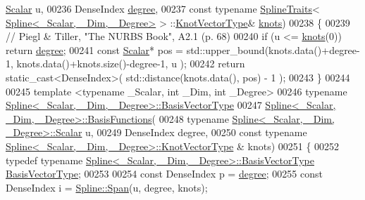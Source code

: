 \begin{DoxyCode}
      \hyperlink{group___splines___module_a8cafd78b564825c76fbb3419653d9742}{Scalar} u,
00236     DenseIndex \hyperlink{group___splines___module_a0df23e941ac0f31dcd095a4dd4f4a7ec}{degree},
00237     \textcolor{keyword}{const} \textcolor{keyword}{typename} \hyperlink{struct_eigen_1_1_spline_traits}{SplineTraits}< \hyperlink{group___splines___module_class_eigen_1_1_spline}{Spline<\_Scalar, \_Dim, \_Degree>} >
      ::\hyperlink{group___splines___module_a066f7a8b120316c9068b559f0790e9ec}{KnotVectorType}& \hyperlink{group___splines___module_ae3eac8af580ad880d8ad3a259d453aa1}{knots})
00238   \{
00239     \textcolor{comment}{// Piegl & Tiller, "The NURBS Book", A2.1 (p. 68)}
00240     \textcolor{keywordflow}{if} (u <= \hyperlink{group___splines___module_ae3eac8af580ad880d8ad3a259d453aa1}{knots}(0)) \textcolor{keywordflow}{return} \hyperlink{group___splines___module_a0df23e941ac0f31dcd095a4dd4f4a7ec}{degree};
00241     \textcolor{keyword}{const} \hyperlink{group___splines___module_a8cafd78b564825c76fbb3419653d9742}{Scalar}* pos = std::upper\_bound(knots.data()+degree-1, knots.data()+knots.size()-degree-1, u
      );
00242     \textcolor{keywordflow}{return} \textcolor{keyword}{static\_cast<}DenseIndex\textcolor{keyword}{>}( std::distance(knots.data(), pos) - 1 );
00243   \}
00244 
00245   \textcolor{keyword}{template} <\textcolor{keyword}{typename} \_Scalar, \textcolor{keywordtype}{int} \_Dim, \textcolor{keywordtype}{int} \_Degree>
00246   \textcolor{keyword}{typename} \hyperlink{group___splines___module_a1d49cef942ea59d85d1711ee32354e6b}{Spline<\_Scalar, \_Dim, \_Degree>::BasisVectorType}
00247     \hyperlink{group___splines___module_a038506788499d71aedddc5211c33bb6e}{Spline<\_Scalar, \_Dim, \_Degree>::BasisFunctions}(
00248     \textcolor{keyword}{typename} \hyperlink{group___splines___module_a8cafd78b564825c76fbb3419653d9742}{Spline<\_Scalar, \_Dim, \_Degree>::Scalar} u,
00249     DenseIndex degree,
00250     \textcolor{keyword}{const} \textcolor{keyword}{typename} \hyperlink{group___splines___module_a066f7a8b120316c9068b559f0790e9ec}{Spline<\_Scalar, \_Dim, \_Degree>::KnotVectorType}
      & knots)
00251   \{
00252     \textcolor{keyword}{typedef} \textcolor{keyword}{typename} \hyperlink{group___splines___module_a1d49cef942ea59d85d1711ee32354e6b}{Spline<\_Scalar, \_Dim, \_Degree>::BasisVectorType}
       \hyperlink{group___splines___module_a1d49cef942ea59d85d1711ee32354e6b}{BasisVectorType};
00253 
00254     \textcolor{keyword}{const} DenseIndex p = \hyperlink{group___splines___module_a0df23e941ac0f31dcd095a4dd4f4a7ec}{degree};
00255     \textcolor{keyword}{const} DenseIndex i = \hyperlink{group___splines___module_aaba7632c61b84194e890696c2b57be1b}{Spline::Span}(u, degree, knots);

\end{DoxyCode}
